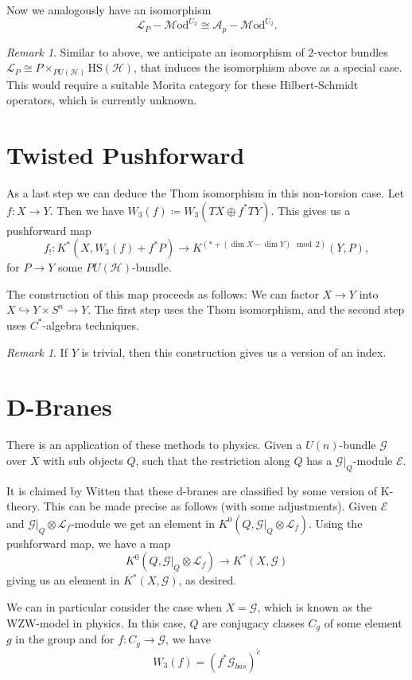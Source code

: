 \documentclass[a4paper]{book}
\newcommand{\lA}{\mathcal{A}}
\newcommand{\lE}{\mathcal{E}}
\newcommand{\lG}{\mathcal{G}}
\newcommand{\lH}{\mathcal{H}}
\newcommand{\lL}{\mathcal{L}}
\newcommand{\lM}{\mathcal{M}}
\newcommand{\Mod}{\lM\mathrm{od}} %
\theoremstyle{definition}
\theoremstyle{remark}
\newtheorem{remark}[equation]{Remark}
\numberwithin{equation}{section}
\begin{document}
Now we analogously have an isomorphism 
\[\lL_P-\Mod^{U_2} \cong \lA_p- \Mod^{U_2}. \]

\begin{remark}
	Similar to above, we anticipate an isomorphism	of $2$-vector bundles $\lL_P \cong P \times_{PU(\lH)} \mathrm{HS}(\lH)$, that induces the isomorphism above as a special case. This would require a suitable Morita category for these Hilbert-Schmidt operators, which is currently unknown.
\end{remark}

\section{Twisted Pushforward}
As a last step we can deduce the Thom	isomorphism in this non-torsion case. 
Let $f\colon X \to Y$. Then we have $W_3(f) \coloneq W_3(TX \oplus f^* TY)$. This gives us a pushforward map 
\[f_!\colon K^*(X,W_3(f) + f^*P) \to K^{(*  + (\dim X - \dim Y) \mod 2)}(Y,P), \]
for $P \to Y$ some $PU(\lH)$-bundle.

The construction of this map proceeds as follows: We can factor $X \to Y$ into $X \hookrightarrow Y \times S^n \to Y$. The first step uses the Thom isomorphism, and the second step uses $C^*$-algebra techniques.

\begin{remark}
 If $Y$ is trivial, then this construction gives us a version of an index. 
\end{remark}

\section{D-Branes}
	There is an application of these methods to physics. Given a $U(n)$-bundle $\lG$ over $X$ with sub objects $Q$, such that the restriction along $Q$ has a  $\lG|_Q$-module $\lE$.

	It is claimed by Witten that these d-branes are classified by some version of K-theory. This can be made precise as follows (with some adjustments). Given $\lE$ and $\lG|_Q \otimes \lL_f$-module we get an element in  $K^0(Q, \lG|_Q \otimes \lL_f)$. Using the pushforward map, we have a map
	\[K^0(Q, \lG|_Q \otimes \lL_f) \to K^*(X,\lG) \] 
giving us an element	in $K^*(X,\lG)$, as desired.

We can in particular consider the case when $X = \lG$, which is known as the WZW-model in physics. In this case, $Q$ are conjugacy classes $C_g$ of some element $g$ in the group and for $f\colon C_g \to \lG$, we have 
\[W_3(f) = (f^* \lG_{bas})^{\check{c}}\]  
	
\end{document}
